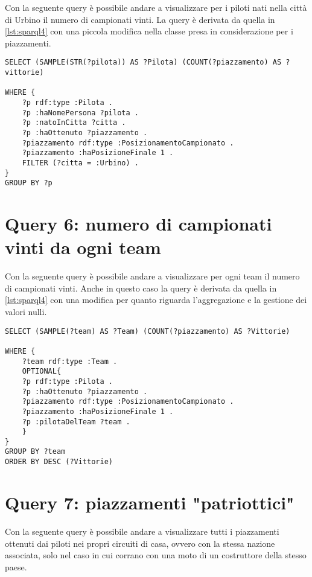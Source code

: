 Con la seguente query è possibile andare a visualizzare per i piloti nati nella città di Urbino il numero di campionati vinti. La query è derivata da quella in \ref{lst:sparql4} con una piccola modifica nella classe presa in considerazione per i piazzamenti.
\\

\begin{lstlisting}[captionpos=b, caption=Numero di campionati vinti da ogni pilota, label=lst:sparql5,
   basicstyle=\ttfamily,frame=single]
SELECT (SAMPLE(STR(?pilota)) AS ?Pilota) (COUNT(?piazzamento) AS ?vittorie) 

WHERE {
	?p rdf:type :Pilota .
	?p :haNomePersona ?pilota .
	?p :natoInCitta ?citta .
	?p :haOttenuto ?piazzamento .
	?piazzamento rdf:type :PosizionamentoCampionato .
	?piazzamento :haPosizioneFinale 1 .	
	FILTER (?citta = :Urbino) .
}
GROUP BY ?p
\end{lstlisting}

\section{Query 6: numero di campionati vinti da ogni team}

Con la seguente query è possibile andare a visualizzare per ogni team il numero di campionati vinti. Anche in questo caso la query è derivata da quella in \ref{lst:sparql4} con una modifica per quanto riguarda l'aggregazione e la gestione dei valori nulli.
\\

\begin{lstlisting}[captionpos=b, caption=Numero di campionati vinti da ogni team, label=lst:sparql6,
   basicstyle=\ttfamily,frame=single]
SELECT (SAMPLE(?team) AS ?Team) (COUNT(?piazzamento) AS ?Vittorie) 

WHERE {
	?team rdf:type :Team .
	OPTIONAL{
	?p rdf:type :Pilota .
	?p :haOttenuto ?piazzamento .
	?piazzamento rdf:type :PosizionamentoCampionato .
	?piazzamento :haPosizioneFinale 1 .	
	?p :pilotaDelTeam ?team .
	}
}
GROUP BY ?team 
ORDER BY DESC (?Vittorie)
\end{lstlisting}

\newpage

\section{Query 7: piazzamenti "patriottici"}

Con la seguente query è possibile andare a visualizzare tutti i piazzamenti ottenuti dai piloti nei propri circuiti di casa, ovvero con la stessa nazione associata, solo nel caso in cui corrano con una moto di un costruttore della stesso paese.
\\

